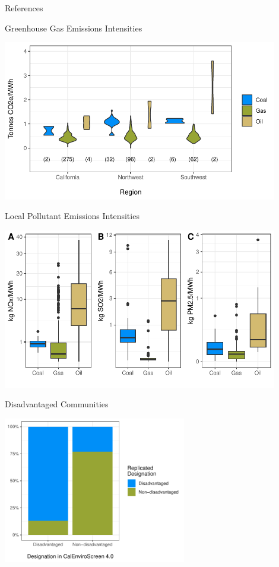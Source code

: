 \documentclass[11pt, aspectratio = 169]{beamer}
\newcommand{\1}{\mathds{1}}
\begin{document}
\begin{frame}[allowframebreaks]{References}
\footnotesize



\end{frame}


\begin{frame}{Greenhouse Gas Emissions Intensities}

\centering
\includegraphics[width = 0.9\textwidth]{figures/chapter5_figures/EI_region_violin.pdf}
    
\end{frame}

\begin{frame}{Local Pollutant Emissions Intensities}

    \centering
    \includegraphics[width = 0.9\textwidth]{figures/chapter5_figures/local_poll_EI.pdf}
        
\end{frame}

\begin{frame}{Disadvantaged Communities}

\centering
\includegraphics[width = 0.6\textwidth]{figures/chapter5_figures/DAC_designation.pdf}
    
\end{frame}
\end{document}
